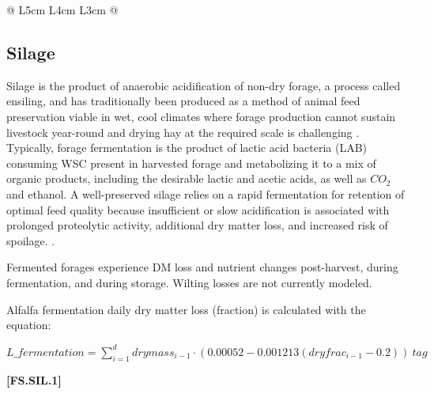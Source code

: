 \begin{refsection}
\begin{table}[h!]
\begin{tabular}{@{} L{5cm} L{4cm} L{3cm} @{}}
                           
\bottomrule
\end{tabular}
\end{table}
\vspace{1cm}


\subsection{Silage} Silage is the product of anaerobic acidification of non-dry forage, a process called ensiling, and has traditionally been produced as a method of animal feed preservation viable in wet, cool climates where forage production cannot sustain livestock year-round and drying hay at the required scale is challenging \parencite{pahlow2003microbiology}. Typically, forage fermentation is the product of lactic acid bacteria (LAB) consuming WSC present in harvested forage and metabolizing it to a mix of organic products, including the desirable lactic and acetic acids, as well as \(CO_2\) and ethanol. A well-preserved silage relies on a rapid fermentation for retention of optimal feed quality because insufficient or slow acidification is associated with prolonged proteolytic activity, additional dry matter loss, and increased risk of spoilage. \parencite{pahlow2003microbiology, muck2013recent}.

Fermented forages experience DM loss and nutrient changes post-harvest, during fermentation, and during storage. Wilting losses are not currently modeled.


Alfalfa fermentation daily dry matter loss (fraction) is calculated with the equation:


        \begin{center}
        \(L\_{fermentation} = \sum_{i=1}^{d} drymass_{i-1} \cdot (0.00052 - 0.001213(dryfrac_{i-1} - 0.2))\ tag\)
    \end{center}
        \vspace{0.5cm}
    
            {\raggedleft \textbf{[FS.SIL.1]}\par}
        \vspace{0.5cm}


\end{refsection}
